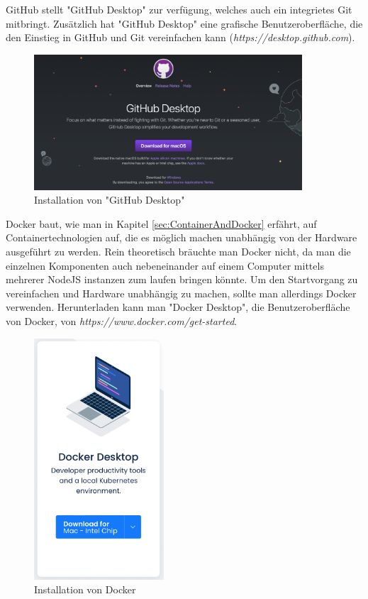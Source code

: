 GitHub stellt "GitHub Desktop" zur verfügung, welches auch ein integrietes Git mitbringt. Zusätzlich hat "GitHub Desktop" eine grafische  Benutzeroberfläche, die den Einstieg in GitHub und Git vereinfachen kann (\emph{https://desktop.github.com}). 

\begin{figure}[H]
    \centering
    \includegraphics[width=100mm]{media/Handbuch/github_desktop.png}
    \caption{Installation von "GitHub Desktop"}
    \label{fig:githubdesktop}
\end{figure}


Docker baut, wie man in Kapitel \ref{sec:ContainerAndDocker} erfährt, auf Containertechnologien auf, die es möglich machen unabhängig von der Hardware ausgeführt zu werden. Rein theoretisch bräuchte man Docker nicht, da man die einzelnen Komponenten auch nebeneinander auf einem Computer mittels mehrerer NodeJS instanzen zum laufen bringen könnte. Um den Startvorgang zu vereinfachen und Hardware unabhängig zu machen, sollte man allerdings Docker verwenden. Herunterladen kann man "Docker Desktop", die Benutzeroberfläche von Docker, von \emph{https://www.docker.com/get-started}.

\begin{figure}[H]
    \centering
    \includegraphics[height=90mm]{media/Handbuch/dockerdesktop.png}
    \caption{Installation von Docker}
\end{figure}

